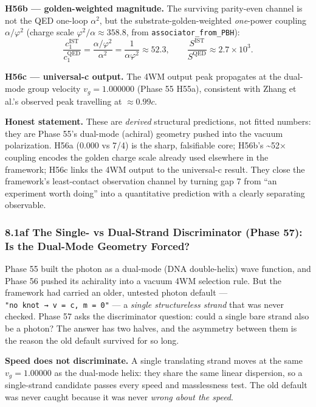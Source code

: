 \documentclass[
]{article}
\begin{document}
\textbf{H56b --- golden-weighted magnitude.} The surviving parity-even
channel is not the QED one-loop \(\alpha^2\), but the
substrate-golden-weighted \emph{one}-power coupling \(\alpha/\varphi^2\)
(charge scale \(\varphi^2/\alpha \approx 358.8\), from
\texttt{associator\_from\_PBH}):
\[\frac{c_1^{\text{IST}}}{c_1^{\text{QED}}} = \frac{\alpha/\varphi^2}{\alpha^2} = \frac{1}{\alpha\varphi^2} \approx 52.3, \qquad \frac{S^{\text{IST}}}{S^{\text{QED}}} \approx 2.7\times 10^3.\]

\textbf{H56c --- universal-c output.} The 4WM output peak propagates at
the dual-mode group velocity \(v_g = 1.000000\) (Phase 55 H55a),
consistent with Zhang et al.'s observed peak travelling at
\(\approx 0.99c\).

\textbf{Honest statement.} These are \emph{derived} structural
predictions, not fitted numbers: they are Phase 55's dual-mode (achiral)
geometry pushed into the vacuum polarization. H56a (0.000 vs 7/4) is the
sharp, falsifiable core; H56b's \textasciitilde52× coupling encodes the
golden charge scale already used elsewhere in the framework; H56c links
the 4WM output to the universal-c result. They close the framework's
least-contact observation channel by turning gap 7 from ``an experiment
worth doing'' into a quantitative prediction with a clearly separating
observable.

\subsubsection{8.1af The Single- vs Dual-Strand Discriminator (Phase
57): Is the Dual-Mode Geometry
Forced?}\label{af-the-single--vs-dual-strand-discriminator-phase-57-is-the-dual-mode-geometry-forced}

Phase 55 built the photon as a dual-mode (DNA double-helix) wave
function, and Phase 56 pushed its achirality into a vacuum 4WM selection
rule. But the framework had carried an older, untested photon default
--- \texttt{"no\ knot\ →\ v\ =\ c,\ m\ =\ 0"} --- a \emph{single
structureless strand} that was never checked. Phase 57 asks the
discriminator question: could a single bare strand also be a photon? The
answer has two halves, and the asymmetry between them is the reason the
old default survived for so long.

\textbf{Speed does not discriminate.} A single translating strand moves
at the same \(v_g = 1.00000\) as the dual-mode helix: they share the
same linear dispersion, so a single-strand candidate passes every speed
and masslessness test. The old default was never caught because it was
never \emph{wrong about the speed}.
\end{document}
